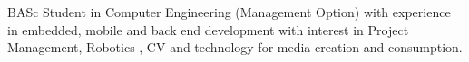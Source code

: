 

\begin{cvparagraph}

BASc Student in Computer Engineering (Management Option) with experience in embedded, mobile and back end development with interest in Project Management, Robotics , CV and technology for media creation and consumption. 
\end{cvparagraph}
